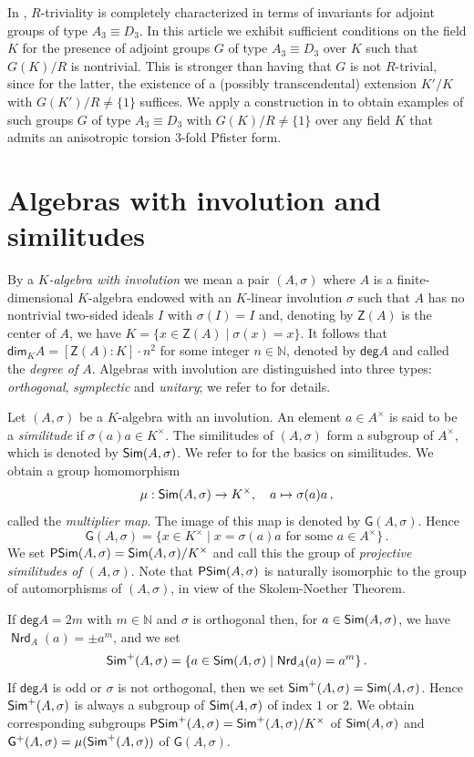 \documentclass[twoside,11pt]{amsart}
\numberwithin{equation}{section}
\theoremstyle{definition}
\renewcommand{\dim}{\operatorname{\mathsf{dim}}}
\renewcommand{\deg}{\operatorname{\mathsf{deg}}}
\newcommand\Nrd{\operatorname{\mathsf{Nrd}}}
\newcommand{\mg}[1]{{#1}^{\times}}
\newcommand{\s}{\sigma}
\newcommand{\nat}{\mathbb{N}}
\newcommand{\Sim}{{\bf\mathsf{Sim}}}
\newcommand{\PSim}{{\bf\mathsf{PSim}}}
\newcommand{\G}{\mathsf{G}}
\newcommand{\Z}{\mathsf{Z}}
\renewcommand{\deg}{\mathsf{deg}}
\renewcommand{\dim}{\mathsf{dim}}
\begin{document}
In \cite[Theorem~3]{Mer96}, $R$-triviality is completely characterized in terms of invariants for adjoint groups of type $A_3\equiv D_3$. 
In this article we exhibit sufficient conditions on the field $K$ for the presence of adjoint groups $G$ of type $A_3\equiv D_3$ over $K$ such that $G(K)/R$ is nontrivial.
This is stronger than having that $G$ is not $R$-trivial, since for the latter, the existence of a (possibly transcendental) extension $K'/K$ with $G(K')/R\neq \{1\}$ suffices.
We apply a construction in \cite{Mer96} to obtain examples of such groups $G$ of type $A_3\equiv D_3$ with $G(K)/R\neq\{1\}$ over any field $K$ that admits an anisotropic torsion $3$-fold Pfister form.



\section{Algebras with involution and similitudes}

By a \emph{$K$-algebra with involution} we mean a pair $(A,\s)$ where
$A$ is a finite-dimensional $K$-algebra endowed with an $K$-linear involution $\s$ such that $A$ has no nontrivial two-sided ideals $I$ with $\s(I)=I$ and, denoting by $\Z(A)$ is the center of $A$, we have $K=\{x\in\Z(A)\mid \s(x)=x\}$.
It follows that $\dim_KA=[\Z(A):K]\cdot n^2$ for some integer $n\in\nat$, denoted by $\deg A$ and called the \emph{degree of $A$}.
Algebras with involution are distinguished into three types: \emph{orthogonal}, \emph{symplectic} and \emph{unitary}; we refer to \cite[\S 2]{KMRT98} for details.

Let $(A, \sigma)$ be a $K$-algebra with an 
involution. An element $a\in \mg{A}$ is said to be a 
{\it similitude} if $\sigma(a)a \in \mg{K}$. 
The similitudes of $(A, \sigma)$ form a subgroup of $\mg{A}$, which is denoted by 
$\Sim(A, \sigma)$. We refer to 
\cite[\S 12]{KMRT98} for the basics on similitudes. 
We obtain a group homomorphism 
$$\mu: \Sim(A, \sigma) \to \mg{K},\quad  a\mapsto \sigma(a)a\,,$$
called the \emph{multiplier map}.
The image of this map is denoted by $\G(A, \sigma)$. 
Hence $$\G(A,\s)=\{x\in\mg{K}\mid x=\s(a)a\mbox{ for some }a\in\mg{A}\}\,.$$
We set $\PSim(A,\s)=\Sim(A,\s)/\mg{K}$ and call this the group of \emph{projective similitudes of $(A,\s)$}.
Note that $\PSim(A,\s)$ is naturally isomorphic to
the group of automorphisms of $(A,\s)$, in view of the Skolem-Noether Theorem.

If $\deg A=2m$ with $m\in\nat$ and $\s$ is orthogonal then, for $a\in\Sim(A,\s)$, we have 
$\Nrd_A(a)=\pm a^m$, and we set 
$$\Sim^+(A,\s) = \{a\in\Sim(A,\s)\mid \Nrd_A(a)=a^m\}\,.$$
If $\deg A$ is odd or $\s$ is not orthogonal, then we set $\Sim^+(A,\s)=\Sim(A,\s)$.
Hence $\Sim^+(A,\s)$ is always a subgroup of $\Sim(A,\s)$ of index $1$ or $2$.
We obtain corresponding subgroups 
$\PSim^+(A,\s)=\Sim^+(A,\s)/\mg{K}$ of $\Sim(A,\s)$ and $\G^+(A,\s)=\mu(\Sim^+(A,\s))$ of $\G(A,\s)$.
\end{document}
